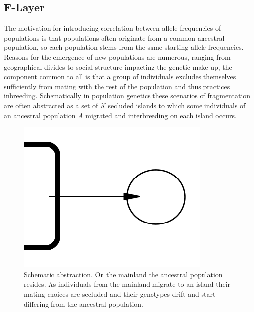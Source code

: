 \documentclass[a4paper, 11pt]{article}
\begin{document}




\subsection{F-Layer}

The motivation for introducing correlation between allele frequencies of populations is that populations often originate from a common ancestral population, so each population stems from the same starting allele frequencies. Reasons for the emergence of new populations are numerous, ranging from geographical divides to social structure impacting the genetic make-up, the component common to all is that a group of individuals excludes themselves sufficiently from mating with the rest of the population and thus practices inbreeding. Schematically in population genetics these scenarios of fragmentation are often abstracted as a set of $K$ secluded islands to which some individuals of an ancestral population $A$ migrated and interbreeding on each island occurs.

\begin{figure}
\centering
\includegraphics[scale=0.5]{level_1}
\caption{Schematic abstraction. On the mainland the ancestral population resides. As individuals from the mainland migrate to an island their mating choices are secluded and their genotypes drift and start differing from the ancestral population.}
\end{figure}
\end{document}
